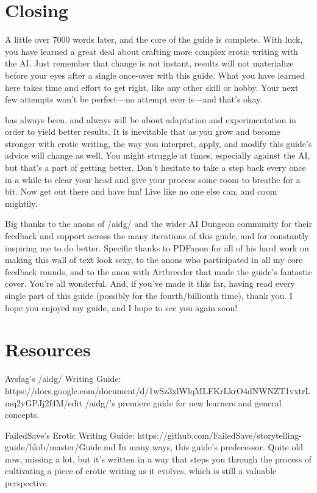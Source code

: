 ﻿\documentclass[Coomer-main.tex]{subfiles}
\begin{document}
\chapter{Closing}

A little over 7000 words later, and the core of the guide is complete. With luck, you have learned a great deal about crafting more complex erotic writing with the AI. Just remember that change is not instant, results will not materialize before your eyes after a single once-over with this guide. What you have learned here takes time and effort to get right, like any other skill or hobby. Your next few attempts won't be perfect—no attempt ever is—and that's okay.

\aid has always been, and always will be about adaptation and experimentation in order to yield better results. It is inevitable that as you grow and become stronger with erotic writing, the way you interpret, apply, and modify this guide's advice will change as well. You might struggle at times, especially against the AI, but that's a part of getting better. Don't hesitate to take a step back every once in a while to clear your head and give your process some room to breathe for a bit. Now get out there and have fun! Live like no one else can, and coom mightily.

Big thanks to the anons of /aidg/ and the wider AI Dungeon community for their feedback and support across the many iterations of this guide, and for constantly inspiring me to do better. Specific thanks to PDFanon for all of his hard work on making this wall of text look sexy, to the anons who participated in all my core feedback rounds, and to the anon with Artbreeder that made the guide’s fantastic cover. You're all wonderful. And, if you've made it this far, having read every single part of this guide (possibly for the fourth/billionth time), thank you. I hope you enjoyed my guide, and I hope to see you again soon!

\chapter{Resources}

Avsfag’s /aidg/ Writing Guide:
https://docs.google.com/document/d/1wSz3xlWlqMLFKrLkrO4dNWNZT1vxtrLmq2yGPJj2f4M/edit
/aidg/’s premiere guide for new learners and general concepts.


FailedSave’s Erotic Writing Guide:
https://github.com/FailedSave/storytelling-guide/blob/master/Guide.md
In many ways, this guide’s predecessor. Quite old now, missing a lot, but it’s written in a way that steps you through the process of cultivating a piece of erotic writing as it evolves, which is still a valuable perspective.
\end{document}
